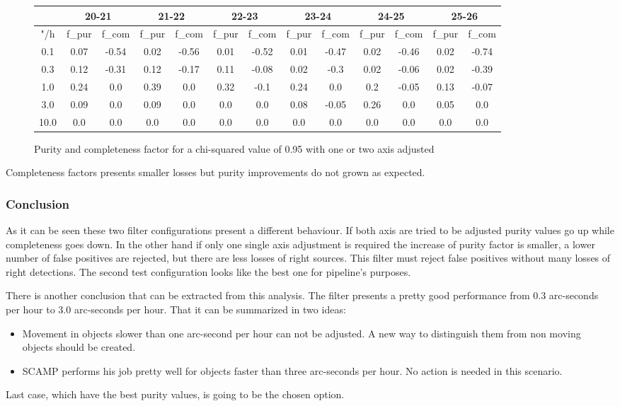 \documentclass{article}
\begin{document}
\begin{figure}[H]
\centering
\begin{tabular}{|c|c|c|c|c|c|c|c|c|c|c|c|c|}
\hline
\multicolumn{1}{|c|}{} & \multicolumn{2}{|c|}{20-21} & \multicolumn{2}{|c|}{21-22} & \multicolumn{2}{|c|}{22-23} & \multicolumn{2}{|c|}{23-24} & \multicolumn{2}{|c|}{24-25} & \multicolumn{2}{|c|}{25-26}\\
\hline \hline
"/h & f\_pur & f\_com & f\_pur & f\_com & f\_pur & f\_com & f\_pur & f\_com & f\_pur & f\_com & f\_pur & f\_com \\
\hline
0.1 & 0.07 & -0.54 & 0.02 & -0.56 & 0.01 & -0.52 & 0.01 & -0.47 & 0.02 & -0.46 & 0.02 & -0.74\\
\hline
0.3 & 0.12 & -0.31 & 0.12 & -0.17 & 0.11 & -0.08 & 0.02 & -0.3 & 0.02 & -0.06 & 0.02 & -0.39\\
\hline
1.0 & 0.24 & 0.0 & 0.39 & 0.0 & 0.32 & -0.1 & 0.24 & 0.0 & 0.2 & -0.05 & 0.13 & -0.07\\
\hline
3.0 & 0.09 & 0.0 & 0.09 & 0.0 & 0.0 & 0.0 & 0.08 & -0.05 & 0.26 & 0.0 & 0.05 & 0.0\\
\hline
10.0 & 0.0 & 0.0 & 0.0 & 0.0 & 0.0 & 0.0 & 0.0 & 0.0 & 0.0 & 0.0 & 0.0 & 0.0\\
\hline
\end{tabular}
\caption{Purity and completeness factor for a chi-squared value of 0.95 with one or two axis adjusted}
\end{figure}

Completeness factors presents smaller losses but purity improvements do not grown as expected. 

\subsubsection{Conclusion}
As it can be seen these two filter configurations present a different behaviour. If both axis are tried to be adjusted purity values go up while completeness goes down. In the other hand if only one single axis adjustment is required the increase of purity factor is smaller, a lower number of false positives are rejected, but there are less losses of right sources. This filter must reject false positives without many losses of right detections. The second test configuration looks like the best one for pipeline's purposes.
\par There is another conclusion that can be extracted from this analysis. The filter presents a pretty good performance from 0.3 arc-seconds per hour to 3.0 arc-seconds per hour. That it can be summarized in two ideas:
\begin{itemize}
\item Movement in objects slower than one arc-second per hour can not be adjusted. A new way to distinguish them from non moving objects should be created.
\item SCAMP performs his job pretty well for objects faster than three arc-seconds per hour. No action is needed in this scenario.
\end{itemize}
Last case, which have the best purity values, is going to be the chosen option.
\end{document}

